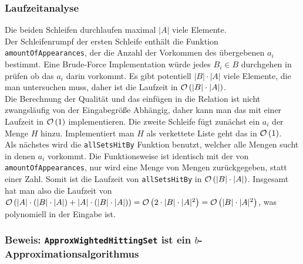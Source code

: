 \documentclass[a4paper]{article}
\begin{document}
		\subsubsection*{Laufzeitanalyse}
		Die beiden Schleifen durchlaufen maximal $|A|$ viele Elemente.\\
		Der Schleifenrumpf der ersten Schleife enthält die Funktion \texttt{amountOfAppearances}, der die Anzahl der Vorkommen des übergebenen $a_i$ bestimmt. Eine Brude-Force Implementation würde jedes $B_i\in B$ durchgehen in prüfen ob das $a_i$ darin vorkommt.
		Es gibt potentiell $|B|\cdot |A|$ viele Elemente, die man untersuchen muss, daher ist die Laufzeit in $\mathcal{O}\left(|B|\cdot |A|\right)$.\\
		Die Berechnung der Qualität und das einfügen in die Relation ist nicht zwangsläufig von der Eingabegröße Abhängig, daher kann man das mit einer Laufzeit in $\mathcal{O}\left(1\right)$ implementieren.\n
		Die zweite Schleife fügt zunächst ein $a_i$ der Menge $H$ hinzu. Implementiert man $H$ als verkettete Liste geht das in $\mathcal{O}\left(1\right)$.\\
		Als nächstes wird die \texttt{allSetsHitBy} Funktion benutzt, welcher alle Mengen sucht in denen $a_i$ vorkommt.
		Die Funktionsweise ist identisch mit der von \texttt{amountOfAppearances}, nur wird eine Menge von Mengen zurückgegeben, statt einer Zahl.
		Somit ist die Laufzeit von \texttt{allSetsHitBy} in $\mathcal{O}\left(|B|\cdot |A|\right)$.\n
		Insgesamt hat man also die Laufzeit von $\mathcal{O}\left(|A|\cdot (|B|\cdot |A|) + |A|\cdot (|B|\cdot |A|)\right)=\mathcal{O}\left(2\cdot |B|\cdot |A|^2\right)=\mathcal{O}\left(|B|\cdot |A|^2\right)$, was polynomiell in der Eingabe ist.
		\subsubsection*{Beweis: \texttt{ApproxWightedHittingSet} ist ein $b$-Approximationsalgorithmus}
		
	\section{}
\end{document}
